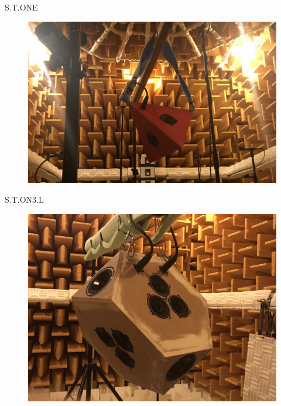 \documentclass[10pt]{beamer}
\begin{document}

\begin{frame}{S.T.ONE}
  \begin{figure}[htbp]
	\begin{center}
		\includegraphics[width=1.\linewidth]{img/IMG_0612.JPG}
	\end{center}
	\end{figure}
\end{frame}


\begin{frame}{S.T.ON3.L}
  \begin{figure}[htbp]
	\begin{center}
		\includegraphics[width=1\linewidth]{img/IMG_0681.JPG}
	\end{center}
	\end{figure}
\end{frame}
\end{document}
